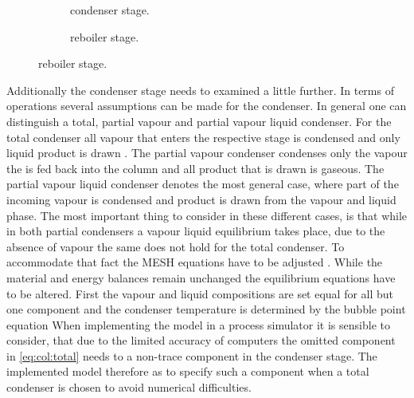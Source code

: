         \begin{figure}
            \centering
            \begin{subfigure}{0.45\textwidth}
                \centering
                
                \caption{condenser stage.}
                \label{fig:col_condenser}
            \end{subfigure}
            \begin{subfigure}{0.45\textwidth}
                \centering
                
                \caption{reboiler stage.}
                \label{fig:col_reboiler}
            \end{subfigure}
        \end{figure}

        Additionally the condenser stage needs to examined a little further. In terms of operations
        several assumptions can be made for the condenser. In general one can distinguish a total,
        partial vapour and partial vapour liquid condenser. For the total condenser all vapour that
        enters the respective stage is condensed and only liquid product is drawn . The partial vapour
        condenser condenses only the vapour the is fed back into
        the column and all product that is drawn is gaseous. The partial vapour liquid condenser
        denotes the most general case, where part of the incoming vapour is condensed and product
        is drawn from the vapour and liquid phase. The most important thing to consider in these different cases,
        is that while in both partial condensers a vapour liquid equilibrium takes place, due to the
        absence of vapour the same does not hold for the total condenser. To accommodate that fact
        the MESH equations have to be adjusted \cite{Naphtali.1971}. While the material and energy
        balances remain unchanged the equilibrium equations have to be altered. First the vapour and
        liquid compositions are set equal for all but one component
        and the condenser temperature is determined by the bubble point equation
        When implementing the model in a process simulator it is sensible to consider, that due to
        the limited accuracy of computers the omitted component in \eqref{eq:col:total} needs to
        a non-trace component in the condenser stage. The implemented model therefore as to specify
        such a component when a total condenser is chosen to avoid numerical difficulties.

